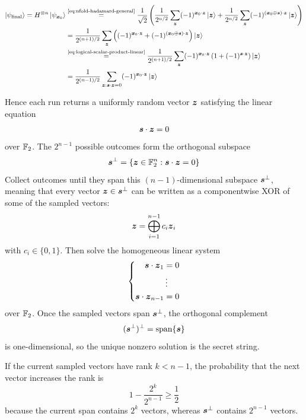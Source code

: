 \[
\begin{aligned}
  \ket{\psi_{\text{final}}}
=
 H^{\otimes n}\ket{\psi_{{\boldsymbol{x}}_0}}
&\overset{\text{\eqref{eq:nfold-hadamard-general}}}{=}
\frac{1}{\sqrt2}
\left(
\frac{1}{2^{n/2}}
\sum_{{\boldsymbol{z}}}
(-1)^{{\boldsymbol{x}}_0\cdot{\boldsymbol{z}}}\ket{{\boldsymbol{z}}}
+
\frac{1}{2^{n/2}}
\sum_{{\boldsymbol{z}}}
(-1)^{({\boldsymbol{x}}_0\oplus{\boldsymbol{s}})\cdot{\boldsymbol{z}}}\ket{{\boldsymbol{z}}}
\right)
\\
&=
\frac{1}{2^{(n+1)/2}}
\sum_{{\boldsymbol{z}}}
\left(
(-1)^{{\boldsymbol{x}}_0\cdot{\boldsymbol{z}}}
+
(-1)^{({\boldsymbol{x}}_0\oplus{\boldsymbol{s}})\cdot{\boldsymbol{z}}}
\right)
\ket{{\boldsymbol{z}}}
\\
&\overset{\text{\eqref{eq:logical-scalar-product-linear}}}{=}
\frac{1}{2^{(n+1)/2}}
\sum_{{\boldsymbol{z}}}
(-1)^{{\boldsymbol{x}}_0\cdot{\boldsymbol{z}}}
\left(
1+(-1)^{{\boldsymbol{s}}\cdot{\boldsymbol{z}}}
\right)
\ket{{\boldsymbol{z}}}
\\
&=
\frac{1}{2^{(n-1)/2}}
\sum_{{\boldsymbol{z}}:{\boldsymbol{s}}\cdot{\boldsymbol{z}}=0}
(-1)^{{\boldsymbol{x}}_0\cdot{\boldsymbol{z}}}\ket{{\boldsymbol{z}}}
\end{aligned}
\]

Hence each run returns a uniformly random vector \({\boldsymbol{z}}\) satisfying the linear equation
\[
{\boldsymbol{s}}\cdot{\boldsymbol{z}}
=
0
\]
over \(\mathbb{F}_2\).
The \(2^{n-1}\) possible outcomes form the orthogonal subspace
\[
{\boldsymbol{s}}^{\perp}
=
\left\{{\boldsymbol{z}}\in\mathbb{F}_2^n:{\boldsymbol{s}}\cdot{\boldsymbol{z}}=0\right\}
\]
Collect outcomes until they span this \((n-1)\)-dimensional subspace ${\boldsymbol{s}}^\perp$, meaning that every vector ${\boldsymbol{z}} \in {\boldsymbol{s}}^\perp$ can be written as a componentwise XOR of some of the sampled vectors:
\[
{\boldsymbol{z}}
=
\bigoplus_{i = 1}^{n-1}
c_i {\boldsymbol{z}}_i
\]
with $c_i \in \{0,1\}$.
Then solve the homogeneous linear system 
\[
\left\{
\begin{alignedat}{1}
{\boldsymbol{s}}\cdot{\boldsymbol{z}}_1 &= 0\\
&\vdots\\
{\boldsymbol{s}}\cdot{\boldsymbol{z}}_{n-1} &= 0
\end{alignedat}
\right.
\]
over \(\mathbb{F}_2\).
Once the sampled vectors span \({\boldsymbol{s}}^\perp\), the orthogonal complement
\[
({\boldsymbol{s}}^{\perp})^{\perp}
=
\operatorname{span}\{{\boldsymbol{s}}\}
\]
is one-dimensional,
so the unique nonzero solution is the secret string.

If the current sampled vectors have rank \(k<n-1\), the probability that the next vector increases the rank is
\[
1-\frac{2^k}{2^{n-1}}
\geq
\frac12
\]
because the current span contains \(2^k\) vectors, whereas
\({\boldsymbol{s}}^{\perp}\) contains \(2^{n-1}\) vectors.


